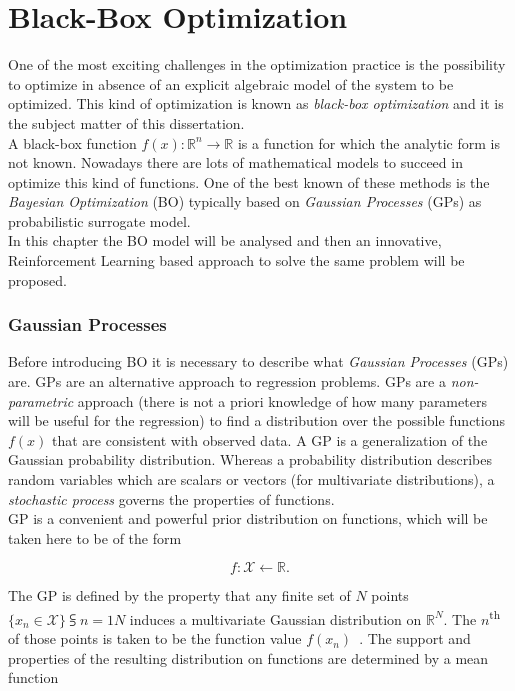 \chapter{Black-Box Optimization}

One of the most exciting challenges in the optimization practice is the possibility to optimize in absence of an explicit algebraic model of the system to be optimized. This kind of optimization is known as \textit{black-box optimization} and it is the subject matter of this dissertation. \\

A black-box function $f(x) : \mathbb{R}^n \rightarrow \mathbb{R}$ is a function for which the analytic form is not known. Nowadays there are lots of mathematical models to succeed in optimize this kind of functions. One of the best known of these methods is the \textit{Bayesian Optimization} (BO) typically based on \textit{Gaussian Processes} (GPs) as probabilistic surrogate model. \\

In this chapter the BO model will be analysed and then an innovative, Reinforcement Learning  based approach to solve the same problem will be proposed.

\subsection{Gaussian Processes} Before introducing BO it is necessary to describe what \textit{Gaussian Processes} (GPs) are. GPs are an alternative approach to regression problems. GPs are a \textit{non-parametric} approach (there is not a priori knowledge of how many parameters will be useful for the regression) to find a distribution over the possible functions $f(x)$ that are consistent with observed data. A GP is a generalization of the Gaussian probability distribution. Whereas a probability distribution describes random variables which are scalars or vectors (for multivariate distributions), a \textit{stochastic process} governs the properties of functions. \\

GP is a convenient and powerful prior distribution on functions, which will be taken here to be of the form 

\begin{equation}
	f : \mathcal{X} \leftarrow \mathbb{R}.
\end{equation}

The GP is defined by the property that any finite set of $N$ points $\{x_n \in \mathcal{X}\}\subsup{}{ n=1}{N}$ induces a multivariate Gaussian distribution  on $\mathbb{R}^N$. The $n$\textsuperscript{th} of those points is taken to be the function value $f(x_n)$~\cite{NIPS2012_4522}. The support and properties of the resulting distribution on functions are determined by a mean function 

